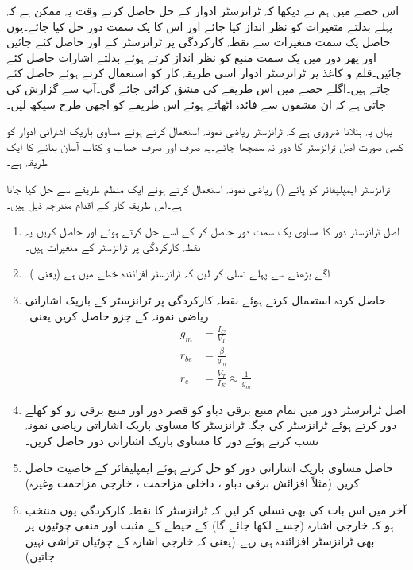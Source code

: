 اس حصے میں ہم نے دیکھا کہ ٹرانزسٹر ادوار کے حل حاصل کرتے وقت یہ ممکن ہے کہ پہلے بدلتے متغیرات کو نظر انداز کیا جائے اور اس کا یک سمت دور حل کیا جائے۔یوں حاصل یک سمت متغیرات سے نقطہ کارکردگی پر ٹرانزسٹر کے  اور  حاصل کئے جائیں اور پھر دور میں یک سمت منبع کو نظر انداز کرتے ہوئے بدلتے اشارات حاصل کئے جائیں۔قلم و کاغذ پر ٹرانزسٹر ادوار اسی طریقہ کار کو استعمال کرتے ہوئے حاصل کئے جاتے ہیں۔اگلے حصے میں اس طریقے کی مشق کرائی جائے گی۔آپ سے گزارش کی جاتی ہے کہ ان مشقوں سے فائدہ اٹھاتے ہوئے اس طریقے کو اچھی طرح سیکھ لیں۔

یہاں یہ بتلانا ضروری ہے کہ ٹرانزسٹر ریاضی نمونہ  استعمال کرتے ہوئے مساوی باریک اشاراتی ادوار کو کسی صورت اصل ٹرانزسٹر کا دور نہ سمجھا جائے۔یہ صرف اور صرف حساب و کتاب آسان بنانے کا ایک طریقہ ہے۔

ٹرانزسٹر ایمپلیفائر کو پائے () ریاضی نمونہ  استعمال کرتے ہوئے ایک منظم طریقے سے حل کیا جاتا ہے۔اس طریقہ کار کے اقدام مندرجہ ذیل ہیں۔
\begin{enumerate}
\item
اصل ٹرانزسٹر دور کا مساوی یک سمت دور حاصل کر کے اسے حل کرتے ہوئے  اور   حاصل کریں۔یہ نقطہ کارکردگی پر ٹرانزسٹر کے متغیرات ہیں۔
\item
آگے بڑھنے سے پہلے تسلی کر لیں کہ ٹرانزسٹر افزائندہ خطے میں ہے (یعنی )۔  
\item
حاصل کردہ  استعمال کرتے ہوئے نقطہ کارکردگی پر ٹرانزسٹر کے باریک 	
اشاراتی ریاضی نمونہ  کے جزو حاصل کریں یعنی۔
\begin{align*}
g_m &=\frac{I_C}{V_T}\\
r_{be}&=\frac{\beta}{g_m}\\
r_e&=\frac{V_T}{I_E} \approx \frac{1}{g_m}
\end{align*}

\item
اصل ٹرانزسٹر دور  میں تمام منبع برقی دباو کو قصر دور اور منبع برقی رو کو کھلے دور کرتے ہوئے ٹرانزسٹر کی جگہ ٹرانزسٹر کا مساوی باریک اشاراتی ریاضی نمونہ  	نسب کرتے ہوئے دور کا مساوی باریک اشاراتی دور حاصل کریں۔
\item
حاصل مساوی باریک اشاراتی دور کو حل کرتے ہوئے ایمپلیفائر کے خاصیت 	حاصل کریں۔(مثلاً افزائش برقی دباو ، داخلی مزاحمت  ، خارجی مزاحمت  وغیرہ)

\item
آخر میں اس بات کی بھی تسلی کر لیں کہ ٹرانزسٹر کا نقطہ کارکردگی یوں منتخب ہو کہ خارجی اشارہ (جسے   لکھا جائے گا) کے حیطے کے مثبت اور منفی چوٹیوں پر بھی ٹرانزسٹر افزائندہ ہی رہے۔(یعنی کہ خارجی اشارہ   کے چوٹیاں تراشی نہیں جاتیں)
\end{enumerate}
	


